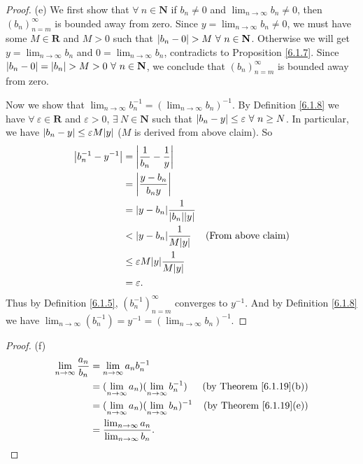 \begin{proof}{(e)}
We first show that \(\forall\ n \in \mathbf{N}\) if \(b_n \neq 0\) and \(\lim_{n \to \infty} b_n \neq 0\), then \((b_n)_{n = m}^\infty\) is bounded away from zero.
Since \(y = \lim_{n \to \infty} b_n \neq 0\), we must have some \(M \in \mathbf{R}\) and \(M > 0\) such that \(\abs*{b_n - 0} > M \ \forall\ n \in \mathbf{N}\).
Otherwise we will get \(y = \lim_{n \to \infty} b_n\) and \(0 = \lim_{n \to \infty} b_n\), contradicts to Proposition \ref{6.1.7}.
Since \(\abs*{b_n - 0} = \abs*{b_n} > M > 0 \ \forall\ n \in \mathbf{N}\), we conclude that \((b_n)_{n = m}^\infty\) is bounded away from zero.

Now we show that \(\lim_{n \to \infty} b_n^{-1} = (\lim_{n \to \infty} b_n)^{-1}\).
By Definition \ref{6.1.8} we have \(\forall\ \varepsilon \in \mathbf{R}\) and \(\varepsilon > 0\), \(\exists\ N \in \mathbf{N}\) such that \(\abs*{b_n - y} \leq \varepsilon \ \forall\ n \geq N\).
In particular, we have \(\abs*{b_n - y} \leq \varepsilon M\abs*{y}\) (\(M\) is derived from above claim).
So
\begin{align*}
\abs*{b_n^{-1} - y^{-1}} &= \abs*{\frac{1}{b_n} - \frac{1}{y}} \\
&= \abs*{\frac{y - b_n}{b_n y}} \\
&= \abs*{y - b_n}\frac{1}{\abs*{b_n}\abs*{y}} \\
&< \abs*{y - b_n}\frac{1}{M\abs*{y}} & \text{(From above claim)} \\
&\leq \varepsilon M\abs*{y}\frac{1}{M\abs*{y}} \\
&= \varepsilon.
\end{align*}
Thus by Definition \ref{6.1.5}, \((b_n^{-1})_{n = m}^\infty\) converges to \(y^{-1}\).
And by Definition \ref{6.1.8} we have \(\lim_{n \to \infty} (b_n^{-1}) = y^{-1} = (\lim_{n \to \infty} b_n)^{-1}\).
\end{proof}

\begin{proof}{(f)}
\begin{align*}
\lim_{n \to \infty} \frac{a_n}{b_n} &= \lim_{n \to \infty} a_n b_n^{-1} \\
&= (\lim_{n \to \infty} a_n)(\lim_{n \to \infty} b_n^{-1}) & \text{(by Theorem \ref{6.1.19}(b))} \\
&= (\lim_{n \to \infty} a_n)(\lim_{n \to \infty} b_n)^{-1} & \text{(by Theorem \ref{6.1.19}(e))} \\
&= \frac{\lim_{n \to \infty} a_n}{\lim_{n \to \infty} b_n}.
\end{align*}
\end{proof}

